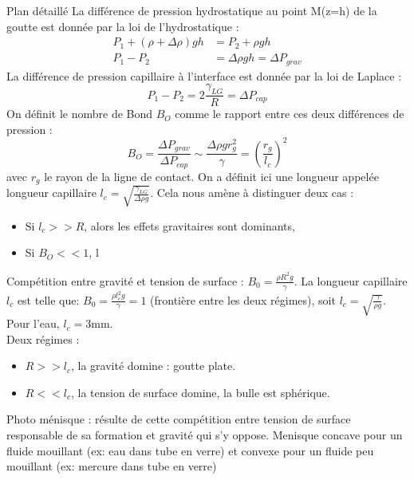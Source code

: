 \begin{reportBlock}{Plan détaillé}
  La différence de pression hydrostatique au point M(z=h) de la goutte est donnée par la loi de l'hydrostatique :
  \begin{align}
      P_1+(\rho+\Delta\rho)gh &= P_2+\rho gh \\
      P_1-P_2 &= \Delta\rho gh = \Delta P_{grav}
  \end{align}
  La différence de pression capillaire à l'interface est donnée par la loi de Laplace :
  \begin{equation}
      P_1-P_2 = 2\frac{\gamma_{LG}}{R} = \Delta P_{cap}
  \end{equation}
  On définit le nombre de Bond $B_O$ comme le rapport entre ces deux différences de pression :
  \begin{equation}
     B_O = \frac{\Delta P_{grav}}{\Delta P_{cap}}\sim \frac{\Delta\rho gr_g^2}{\gamma} = \left(\frac{r_g}{l_c}\right)^2
  \end{equation}
  avec $r_g$ le rayon de la ligne de contact. On a définit ici une longueur appelée longueur capillaire $l_c=\sqrt{\frac{\gamma_{LG}}{\Delta\rho g}}$.
  Cela nous amène à distinguer deux cas :
  \begin{itemize}
      \item Si $l_c>>R$, alors les effets gravitaires sont dominants,
      \item Si $B_O<<1$, l
  \end{itemize}
  Compétition entre gravité et tension de surface : $B_0=\frac{\rho R^2g}{\gamma}$. La longueur capillaire $l_c$ est telle que: $B_0=\frac{\rho l_c^2g}{\gamma}=1$ (frontière entre les deux régimes), soit $l_c = \sqrt{\frac{\gamma}{\rho g}}$.
  Pour l'eau, $l_c=3$mm.\\
  Deux régimes : 
  \begin{itemize}
      \item $R>>l_c$, la gravité domine : goutte plate.
      \item $R<<l_c$, la tension de surface domine, la bulle est sphérique.
  \end{itemize}
  Photo ménisque : résulte de cette compétition entre tension de surface responsable de sa formation et gravité qui s'y oppose. Menisque concave pour un fluide mouillant (ex: eau dans tube en verre) et convexe pour un fluide peu mouillant (ex: mercure dans tube en verre)
  \begin{center}

\end{center}
\end{reportBlock}
